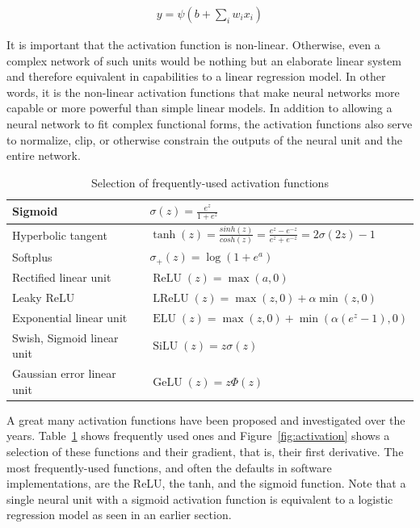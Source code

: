 \begin{align}
y = \psi( b + \sum_i w_i x_i ) \label{eq:neuron}
\end{align}

It is important that the activation function is non-linear. Otherwise, even a complex network of such units would be nothing but an elaborate linear system and therefore equivalent in capabilities to a linear regression model. In other words, it is the non-linear activation functions that make neural networks more capable or more powerful than simple linear models. In addition to allowing a neural network to fit complex functional forms, the activation functions also serve to normalize, clip, or otherwise constrain the outputs of the neural unit and the entire network.

\begin{table}
\renewcommand{\arraystretch}{1.5}

\begin{tabular}{l|l} \hline
Sigmoid & $\sigma(z) = \frac{e^z}{1+e^z}$  \\ \hline
Hyperbolic tangent & $\tanh(z)=\frac{sinh(z)}{cosh(z)} = \frac{e^z-e^{-z}}{e^z+e^{-z}} = 2\sigma(2z)-1$  \\ \hline
Softplus & $\sigma_+(z) = \log(1+e^a)$ \\ \hline
Rectified linear unit & $\operatorname{ReLU}(z) = \max(a, 0) $ \\ \hline
Leaky ReLU & $\operatorname{LReLU}(z)=\max(z, 0) + \alpha \min(z, 0)$  \\ \hline
Exponential linear unit & $\operatorname{ELU}(z) = \max(z, 0) + \min(\alpha(e^z-1), 0)$ \\ \hline
Swish, Sigmoid linear unit & $\operatorname{SiLU}(z) = z \sigma(z)$ \\ \hline
Gaussian error linear unit & $\operatorname{GeLU}(z) = z \Phi(z)$ \\ \hline
\end{tabular}
\caption{Selection of frequently-used activation functions}
\label{tab:activation}
\end{table}

A great many activation functions have been proposed and investigated over the years. Table~\ref{tab:activation} shows frequently used ones and Figure~\ref{fig:activation} shows a selection of these functions and their gradient, that is, their first derivative. The most frequently-used functions, and often the defaults in software implementations, are the ReLU, the tanh, and the sigmoid function. Note that a single neural unit with a sigmoid activation function is equivalent to a logistic regression model as seen in an earlier section.

